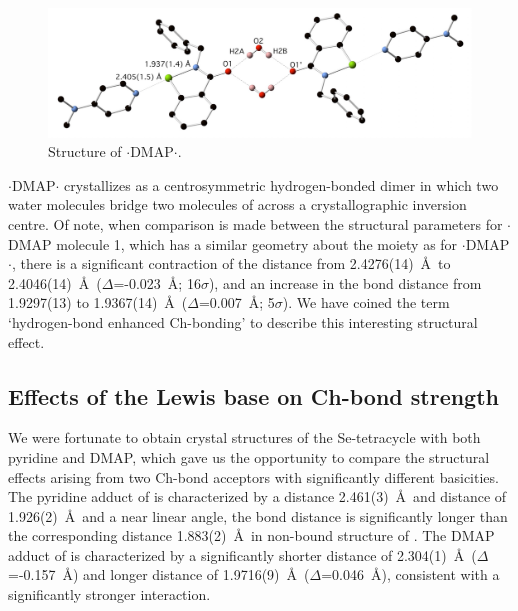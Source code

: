 \begin{refsection}
\begin{figure}
  \centering
  \includegraphics[width=0.8\linewidth]{Figures/benzyl-dmap-hydrate.pdf}
  \caption{Structure of $ \cdot $DMAP$ \cdot $.}\label{fig:benzyl-dmap-hydrate}
\end{figure}

$ \cdot $DMAP$ \cdot $ crystallizes as a centrosymmetric hydrogen-bonded dimer in which two water molecules bridge two molecules of  across a crystallographic inversion centre.
Of note, when comparison is made between the structural parameters for $ \cdot $DMAP molecule 1, which has a similar geometry about the  moiety as for $ \cdot $DMAP$ \cdot $, there is a significant contraction of the distance from 2.4276(14)~\AA\ to 2.4046(14)~\AA\ ($ \Delta $=-0.023~\AA{}; 16$ \sigma $), and an increase in the  bond distance from 1.9297(13) to 1.9367(14)~\AA\ ($ \Delta $=0.007~\AA{}; 5$ \sigma $).
We have coined the term `hydrogen-bond enhanced Ch-bonding' to describe this interesting structural effect.

\subsection{Effects of the Lewis base on Ch-bond strength}
We were fortunate to obtain crystal structures of the Se-tetracycle  with both pyridine and DMAP, which gave us the opportunity to compare the structural effects arising from two Ch-bond acceptors with significantly different basicities.
The pyridine adduct of  is characterized by a  distance 2.461(3)~\AA\ and  distance of 1.926(2)~\AA\ and a near linear  angle, the  bond distance is significantly longer than the corresponding distance 1.883(2)~\AA\ in non-bound structure of .
The DMAP adduct of  is characterized by a significantly shorter  distance of 2.304(1)~\AA\ ($ \Delta $=-0.157~\AA) and longer  distance of 1.9716(9)~\AA\ ($ \Delta $=0.046~\AA), consistent with a significantly stronger interaction.


\end{refsection}
